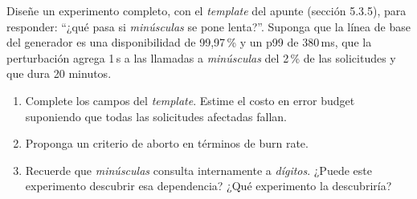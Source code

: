 \documentclass[variant=guia,cover=institutional,mode=screen]{ua-engineering-v6-article}
\begin{document}
\begin{uaexercise}
Diseñe un experimento completo, con el \emph{template} del apunte (sección 5.3.5), para responder: ``¿qué pasa si \emph{minúsculas} se pone lenta?''. Suponga que la línea de base del generador es una disponibilidad de 99,97\,\% y un p99 de 380\,ms, que la perturbación agrega 1\,s a las llamadas a \emph{minúsculas} del 2\,\% de las solicitudes y que dura 20 minutos.
\begin{enumerate}
\item Complete los campos del \emph{template}. Estime el costo en error budget suponiendo que todas las solicitudes afectadas fallan.
\item Proponga un criterio de aborto en términos de burn rate.
\item Recuerde que \emph{minúsculas} consulta internamente a \emph{dígitos}. ¿Puede este experimento descubrir esa dependencia? ¿Qué experimento la descubriría?
\end{enumerate}
\end{uaexercise}
\end{document}
